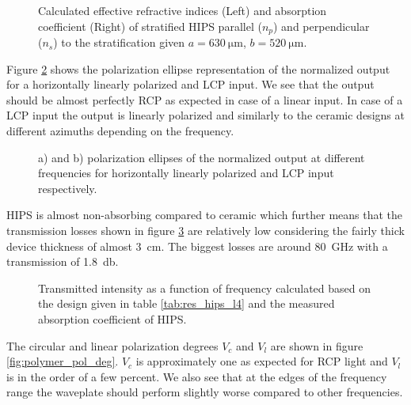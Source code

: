 \begin{figure}[H]
    \centering
    
    \caption{Calculated effective refractive indices (Left) and absorption coefficient (Right) of stratified HIPS parallel ($n_p$) and perpendicular ($n_s$) to the stratification given $a=\SI{630}{\micro \meter}$, $b=\SI{520}{\micro \meter}$.}
    \label{fig:effective_ri_bf_hips}
\end{figure}

Figure \ref{fig:polymer_pe_lp} shows the polarization ellipse representation of the normalized output for a horizontally linearly polarized and LCP input. We see that the output should be almost perfectly RCP as expected in case of a linear input. In case of a LCP input the output is linearly polarized and similarly to the  ceramic designs at different azimuths depending on the frequency. 

\begin{figure}[H]
    \centering
    
    \caption{a) and b) polarization ellipses of the normalized output at different frequencies for horizontally linearly polarized and LCP input respectively.}
    \label{fig:polymer_pe_lp}
\end{figure}

HIPS is almost non-absorbing compared to  ceramic which further means that the transmission losses shown in figure \ref{fig:polymer_intensity} are relatively low considering the fairly thick device thickness of almost \SI{3}{\centi \meter}. The biggest losses are around \SI{80}{\giga \hertz} with a transmission of \SI{1.8}{\decibel}.

\begin{figure}[H]
    \centering
    
    \caption{Transmitted intensity as a function of frequency calculated based on the design given in table \ref{tab:res_hips_l4} and the measured absorption coefficient of HIPS.}
    \label{fig:polymer_intensity}
\end{figure}

The circular and linear polarization degrees $V_c$ and $V_l$ are shown in figure \ref{fig:polymer_pol_deg}. $V_c$ is approximately one as expected for RCP light and $V_l$ is in the order of a few percent. We also see that at the edges of the frequency range the waveplate should perform slightly worse compared to other frequencies.

